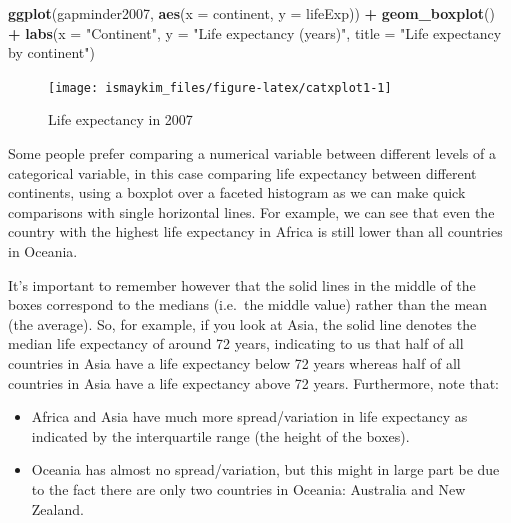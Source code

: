 \documentclass[12pt,]{krantz}
\makeatletter
\newenvironment{Shaded}{\begin{snugshade}}{\end{snugshade}}
\newcommand{\KeywordTok}[1]{\textcolor[rgb]{0.27,0.27,0.27}{\textbf{#1}}}
\newcommand{\DataTypeTok}[1]{\textcolor[rgb]{0.27,0.27,0.27}{#1}}
\newcommand{\StringTok}[1]{\textcolor[rgb]{0.5,0.5,0.5}{#1}}
\newcommand{\OperatorTok}[1]{\textcolor[rgb]{0.43,0.43,0.43}{\textbf{#1}}}
\newcommand{\NormalTok}[1]{#1}
\providecommand{\tightlist}{%
  \setlength{\itemsep}{0pt}\setlength{\parskip}{0pt}}
\newenvironment{kframe}{%
\medskip{}
\setlength{\fboxsep}{.8em}
 \def\at@end@of@kframe{}%
 \ifinner\ifhmode%
  \def\at@end@of@kframe{\end{minipage}}%
  \begin{minipage}{\columnwidth}%
 \fi\fi%
 \def\FrameCommand##1{\hskip\@totalleftmargin \hskip-\fboxsep
 \colorbox{shadecolor}{##1}\hskip-\fboxsep
     \hskip-\linewidth \hskip-\@totalleftmargin \hskip\columnwidth}%
 \MakeFramed {\advance\hsize-\width
   \@totalleftmargin\z@ \linewidth\hsize
   \@setminipage}}%
 {\par\unskip\endMakeFramed%
 \at@end@of@kframe}
\renewenvironment{Shaded}{\begin{kframe}}{\end{kframe}}
\makeatother
\begin{document}
\begin{Shaded}
\begin{Highlighting}[]
\KeywordTok{ggplot}\NormalTok{(gapminder2007, }\KeywordTok{aes}\NormalTok{(}\DataTypeTok{x =}\NormalTok{ continent, }\DataTypeTok{y =}\NormalTok{ lifeExp)) }\OperatorTok{+}
\StringTok{  }\KeywordTok{geom_boxplot}\NormalTok{() }\OperatorTok{+}
\StringTok{  }\KeywordTok{labs}\NormalTok{(}\DataTypeTok{x =} \StringTok{"Continent"}\NormalTok{, }\DataTypeTok{y =} \StringTok{"Life expectancy (years)"}\NormalTok{, }
       \DataTypeTok{title =} \StringTok{"Life expectancy by continent"}\NormalTok{) }
\end{Highlighting}
\end{Shaded}

\begin{figure}

{\centering \texttt{[image: ismaykim\_files/figure-latex/catxplot1-1]} 

}

\caption{Life expectancy in 2007}\label{fig:catxplot1}
\end{figure}

Some people prefer comparing a numerical variable between different
levels of a categorical variable, in this case comparing life expectancy
between different continents, using a boxplot over a faceted histogram
as we can make quick comparisons with single horizontal lines. For
example, we can see that even the country with the highest life
expectancy in Africa is still lower than all countries in Oceania.

It's important to remember however that the solid lines in the middle of
the boxes correspond to the medians (i.e.~the middle value) rather than
the mean (the average). So, for example, if you look at Asia, the solid
line denotes the median life expectancy of around 72 years, indicating
to us that half of all countries in Asia have a life expectancy below 72
years whereas half of all countries in Asia have a life expectancy above
72 years. Furthermore, note that:

\begin{itemize}
\tightlist
\item
  Africa and Asia have much more spread/variation in life expectancy as
  indicated by the interquartile range (the height of the boxes).
\item
  Oceania has almost no spread/variation, but this might in large part
  be due to the fact there are only two countries in Oceania: Australia
  and New Zealand.
\end{itemize}
\end{document}
